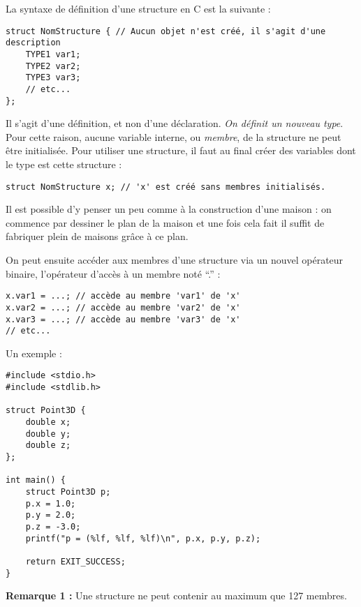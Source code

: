 \documentclass[../../../main.tex]{subfiles}
\begin{document}
La syntaxe de définition d'une structure en C est la suivante :
\begin{verbatim}
struct NomStructure { // Aucun objet n'est créé, il s'agit d'une description
	TYPE1 var1;
	TYPE2 var2;
	TYPE3 var3;
	// etc...
};
\end{verbatim}
Il s'agit d'une définition, et non d'une déclaration. \textit{On définit un nouveau type}. Pour cette raison, aucune variable interne, ou \textit{membre}, de la structure ne peut être initialisée. Pour utiliser une structure, il faut au final créer des variables dont le type est cette structure :
\begin{verbatim}
struct NomStructure x; // 'x' est créé sans membres initialisés.
\end{verbatim}
Il est possible d'y penser un peu comme à la construction d'une maison : on commence par dessiner le plan de la maison et une fois cela fait il suffit de fabriquer plein de maisons grâce à ce plan.
 
On peut ensuite accéder aux membres d'une structure via un nouvel opérateur binaire, l'opérateur d'accès à un membre noté ``.'' :
\begin{verbatim}
x.var1 = ...; // accède au membre 'var1' de 'x'
x.var2 = ...; // accède au membre 'var2' de 'x'
x.var3 = ...; // accède au membre 'var3' de 'x'
// etc...
\end{verbatim}
Un exemple :
\begin{verbatim}
#include <stdio.h>
#include <stdlib.h>

struct Point3D {
	double x;
	double y;
	double z;
};

int main() {
	struct Point3D p;
	p.x = 1.0;
	p.y = 2.0;
	p.z = -3.0;
	printf("p = (%lf, %lf, %lf)\n", p.x, p.y, p.z);

	return EXIT_SUCCESS;
}
\end{verbatim}
\textbf{Remarque 1 :} Une structure ne peut contenir au maximum que 127 membres.
 
\end{document}
